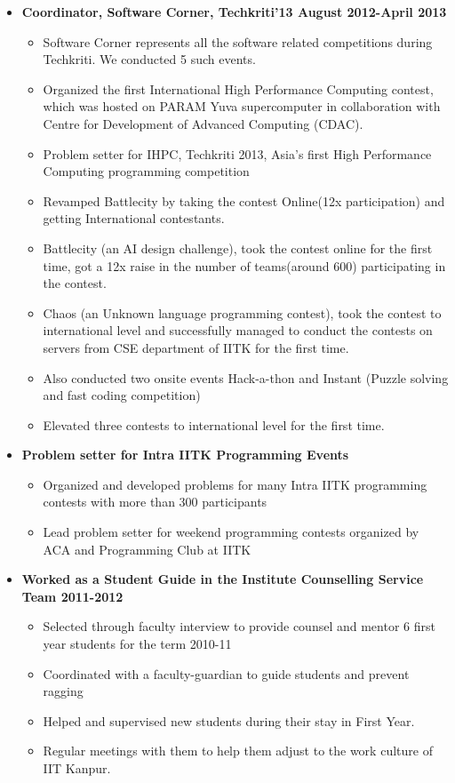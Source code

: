 \documentclass[margin,line]{resume}
\begin{document}
\begin{resume}
\begin{itemize}
  \item  \textbf{\textsf Coordinator, Software Corner, Techkriti'13 August 2012-April 2013}
    \begin{itemize}
    \item Software Corner represents all the software related competitions during Techkriti. We conducted 5 such events.
    \item Organized the first International High Performance Computing contest, which was hosted on PARAM Yuva supercomputer in collaboration with Centre for Development of Advanced Computing (CDAC). 
    \item Problem setter for IHPC, Techkriti 2013, Asia’s first High Performance Computing programming competition
    \item Revamped Battlecity by taking the contest Online(12x participation) and getting International contestants.
    \item  Battlecity (an AI design challenge), took the contest online for the first time, got a 12x raise in the number of teams(around 600) participating in the contest.
    \item Chaos (an Unknown language programming contest), took the contest to international level and successfully managed to conduct the contests on servers from CSE department of IITK for the first time.
    \item Also conducted two onsite events Hack-a-thon and Instant (Puzzle solving and fast coding competition)
    \item Elevated three contests to international level for the first time.
    \end{itemize}

  \item \textbf{\textsf{Problem setter for Intra IITK Programming Events}}
    \begin{itemize}
    \item Organized and developed problems for many Intra IITK programming contests with more than 300 participants
    \item Lead problem setter for weekend programming contests organized by ACA and
Programming Club at IITK
    \end{itemize}

  \item \textbf{\textsf Worked as a Student Guide in the Institute Counselling Service Team 2011-2012}
    \begin{itemize}
    \item Selected through faculty interview to provide counsel and mentor 6 first year students for the term 2010-11
    \item Coordinated with a faculty-guardian to guide students and prevent ragging
    \item Helped and supervised new students during their stay in First Year.
    \item Regular meetings with them to help them adjust to the work culture of IIT Kanpur.
    \end{itemize}


\end{itemize}
\end{resume}
\end{document}
